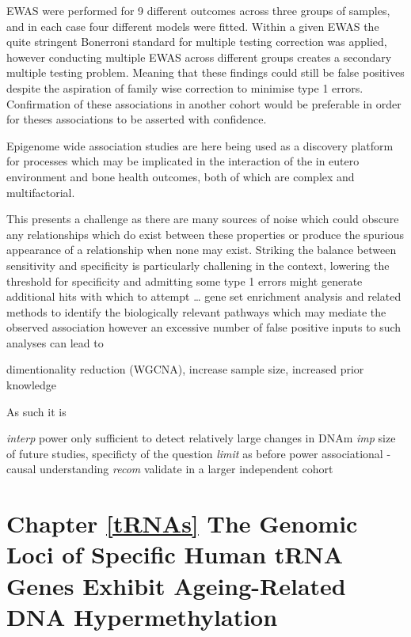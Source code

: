 \documentclass[
]{book}
\begin{document}
EWAS were performed for 9 different outcomes across three groups of samples, and in each case four different models were fitted.
Within a given EWAS the quite stringent Bonerroni standard for multiple testing correction was applied, however conducting multiple EWAS across different groups creates a secondary multiple testing problem.
Meaning that these findings could still be false positives despite the aspiration of family wise correction to minimise type 1 errors.
Confirmation of these associations in another cohort would be preferable in order for theses associations to be asserted with confidence.

Epigenome wide association studies are here being used as a discovery platform for processes which may be implicated in the interaction of the in eutero environment and bone health outcomes, both of which are complex and multifactorial.

This presents a challenge as there are many sources of noise which could obscure any relationships which do exist between these properties or produce the spurious appearance of a relationship when none may exist.
Striking the balance between sensitivity and specificity is particularly challening in the context, lowering the threshold for specificity and admitting some type 1 errors might generate additional hits with which to attempt \ldots{} gene set enrichment analysis and related methods to identify the biologically relevant pathways which may mediate the observed association however an excessive number of false positive inputs to such analyses can lead to

dimentionality reduction (WGCNA), increase sample size, increased prior knowledge

As such it is

\emph{interp}
power only sufficient to detect relatively large changes in DNAm
\emph{imp}
size of future studies, specificty of the question
\emph{limit}
as before power
associational - causal understanding
\emph{recom}
validate in a larger independent cohort

\hypertarget{chapter-reftrnas-the-genomic-loci-of-specific-human-trna-genes-exhibit-ageing-related-dna-hypermethylation}{%
\section{Chapter \ref{tRNAs} The Genomic Loci of Specific Human tRNA Genes Exhibit Ageing-Related DNA Hypermethylation}\label{chapter-reftrnas-the-genomic-loci-of-specific-human-trna-genes-exhibit-ageing-related-dna-hypermethylation}}
\end{document}
